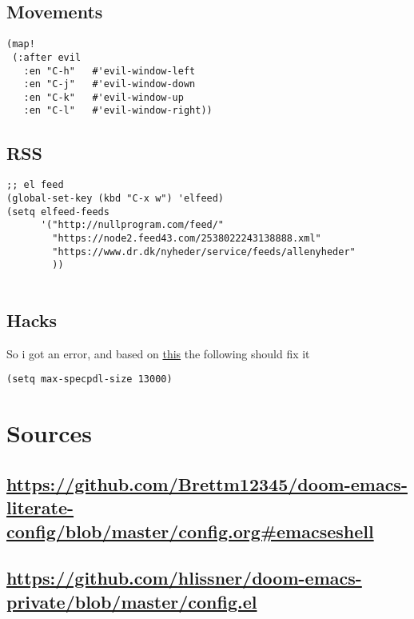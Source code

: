 \documentclass[11pt]{article}
\begin{document}
\subsection{Movements}
\label{sec:org10dfd78}
\begin{verbatim}
(map!
 (:after evil
   :en "C-h"   #'evil-window-left
   :en "C-j"   #'evil-window-down
   :en "C-k"   #'evil-window-up
   :en "C-l"   #'evil-window-right))
\end{verbatim}
\subsection{RSS}
\label{sec:org17d270e}
\begin{verbatim}
;; el feed
(global-set-key (kbd "C-x w") 'elfeed)
(setq elfeed-feeds
      '("http://nullprogram.com/feed/"
        "https://node2.feed43.com/2538022243138888.xml"
        "https://www.dr.dk/nyheder/service/feeds/allenyheder"
        ))


\end{verbatim}
\subsection{Hacks}
\label{sec:orga283162}
So i got an error, and based on \href{https://www.reddit.com/r/emacs/comments/9jp9zt/anyone\_know\_what\_variable\_binding\_depth\_exceeds/}{this} the following should fix it
\begin{verbatim}
(setq max-specpdl-size 13000)
\end{verbatim}

\section{Sources}
\label{sec:orgd772a65}
\subsection{\url{https://github.com/Brettm12345/doom-emacs-literate-config/blob/master/config.org\#emacseshell}}
\label{sec:org69655ed}
\subsection{\url{https://github.com/hlissner/doom-emacs-private/blob/master/config.el}}
\label{sec:org0fcaf1e}
\end{document}
